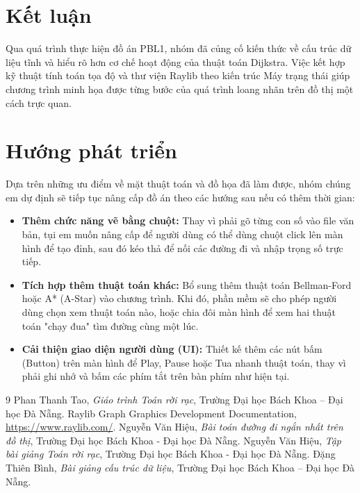 \documentclass[12pt,a4paper,oneside]{report}
\begin{document}
\section{Kết luận}
Qua quá trình thực hiện đồ án PBL1, nhóm đã củng cố kiến thức về cấu trúc dữ liệu tĩnh và hiểu rõ hơn cơ chế hoạt động của thuật toán Dijkstra. Việc kết hợp kỹ thuật tính toán tọa độ và thư viện Raylib theo kiến trúc Máy trạng thái giúp chương trình minh họa được từng bước của quá trình loang nhãn trên đồ thị một cách trực quan.

\section{Hướng phát triển}
Dựa trên những ưu điểm về mặt thuật toán và đồ họa đã làm được, nhóm chúng em dự định sẽ tiếp tục nâng cấp đồ án theo các hướng sau nếu có thêm thời gian:

\begin{itemize}
    \item \textbf{Thêm chức năng vẽ bằng chuột:} Thay vì phải gõ từng con số vào file văn bản, tụi em muốn nâng cấp để người dùng có thể dùng chuột click lên màn hình để tạo đỉnh, sau đó kéo thả để nối các đường đi và nhập trọng số trực tiếp.
    \item \textbf{Tích hợp thêm thuật toán khác:} Bổ sung thêm thuật toán Bellman-Ford hoặc A* (A-Star) vào chương trình. Khi đó, phần mềm sẽ cho phép người dùng chọn xem thuật toán nào, hoặc chia đôi màn hình để xem hai thuật toán "chạy đua" tìm đường cùng một lúc.
    \item \textbf{Cải thiện giao diện người dùng (UI):} Thiết kế thêm các nút bấm (Button) trên màn hình để Play, Pause hoặc Tua nhanh thuật toán, thay vì phải ghi nhớ và bấm các phím tắt trên bàn phím như hiện tại.
\end{itemize}

\newpage
{}
\begin{thebibliography}{9}
Phan Thanh Tao, \textit{Giáo trình Toán rời rạc}, Trường Đại học Bách Khoa – Đại học Đà Nẵng.
Raylib Graph Graphics Development Documentation, \url{https://www.raylib.com/}.
Nguyễn Văn Hiệu, \textit{Bài toán đường đi ngắn nhất trên đồ thị}, Trường Đại học Bách Khoa - Đại học Đà Nẵng.
Nguyễn Văn Hiệu, \textit{Tập bài giảng Toán rời rạc}, Trường Đại học Bách Khoa - Đại học Đà Nẵng.
Đặng Thiên Bình, \textit{Bài giảng cấu trúc dữ liệu}, Trường Đại học Bách Khoa – Đại học Đà Nẵng.
\end{thebibliography}
\end{document}
